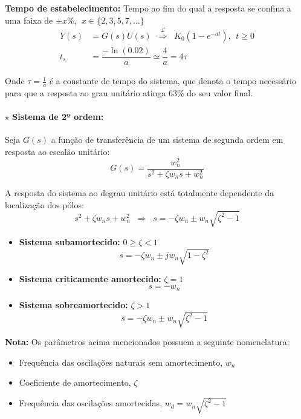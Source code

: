 \vspace{1 em}
\noindent \textbf{Tempo de estabelecimento:} Tempo ao fim do qual a resposta se confina a uma faixa de $\pm x\%,\;\, x \in \{2,3,5,7,\dots\}$
\begin{align*}
    Y(s) &= G(s)U(s)\;\; \overset{\mathcal{L}}{\Longrightarrow}\;\; K_0 (1 - e^{-at}),\;\, t \ge 0\\[4pt]
    t_s &= \dfrac{-\ln(0.02)}{a} \simeq \dfrac{4}{a} = 4\tau
\end{align*}

\noindent Onde $\tau = \frac{1}{a}$ é a constante de tempo do sistema, que denota o tempo necessário para que a resposta ao grau unitário atinga 63\% do seu valor final.

\paragraph[2.1.2.2 Sistema de 2º ordem]{$\pmb{\star}$ Sistema de 2º ordem:} Seja $G(s)$ a função de transferência de um sistema de segunda ordem em resposta ao escalão unitário:
$$
    G(s) = \dfrac{w_n^2}{s^2 + \zeta w_n s + w_n^2} 
$$

\begin{mdframed}
\noindent A resposta do sistema ao degrau unitário está totalmente dependente da localização dos pólos:
$$
    s^2 + \zeta w_n s + w_n^2\;\; \Longrightarrow\;\; s = -\zeta w_n \pm w_n\sqrt{\zeta^2 - 1}
$$

\begin{itemize}
    \item \textbf{Sistema subamortecido:} $0 \ge \zeta < 1$
    $$
        \boxed{s = -\zeta w_n \pm j w_n\sqrt{1 - \zeta^2}}
    $$
    \item \textbf{Sistema criticamente amortecido:} $\zeta = 1$
    $$
        \boxed{s = -w_n}
    $$
    \item \textbf{Sistema sobreamortecido:} $\zeta > 1$
    $$
        \boxed{s = -\zeta w_n \pm w_n\sqrt{\zeta^2 - 1}}
    $$
\end{itemize}

\noindent \textbf{Nota:} Os parâmetros acima mencionados possuem a seguinte nomenclatura:

\begin{itemize}
    \item Frequência das oscilações naturais sem amortecimento, $w_n$
    \item Coeficiente de amortecimento, $\zeta$
    \item Frequência das oscilações amortecidas, $w_d = w_n\sqrt{\zeta^2 - 1}$
\end{itemize}
\end{mdframed}

